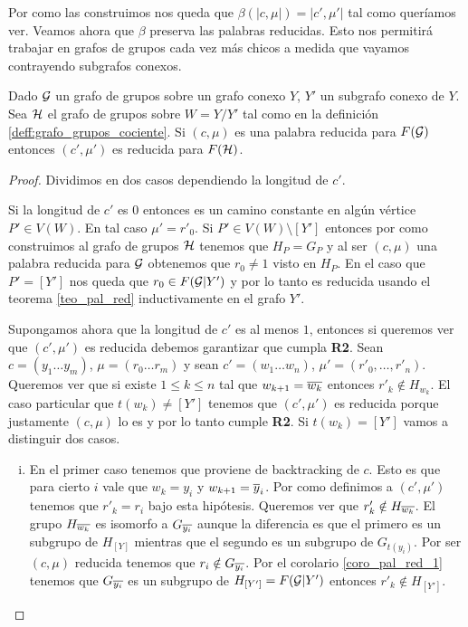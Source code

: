 \documentclass[tesis.tex]{subfiles}
\begin{document}
Por como las construimos nos queda que $\beta(|c,\mu|) = |c',\mu'|$ tal como queríamos ver.
Veamos ahora que $\beta$ preserva las palabras reducidas. 
Esto nos permitirá trabajar en grafos de grupos cada vez más chicos a medida que vayamos contrayendo subgrafos conexos.

\begin{prop}\label{lema_pal_red_iso}
	Dado ${\cal G}$ un grafo de grupos sobre un grafo conexo $Y$, $Y'$ un subgrafo conexo de $Y$.
	Sea ${\cal H}$ el grafo de grupos sobre $W = Y/Y'$ tal como en la definición \ref{deff:grafo_grupos_cociente}.
	Si $(c, \mu)$ es una palabra reducida para $F({\cal G})$ entonces $(c', \mu')$ es reducida para $F({\cal H})$.
\end{prop}
\begin{proof}
	Dividimos en dos casos dependiendo la longitud de $c'$.
	
	Si la longitud de $c'$ es  $0$ entonces es un camino constante en algún vértice $P' \in V(W)$. 
	En tal caso $\mu' = r'_0$.
	Si $P' \in V(W) \setminus [Y']$ entonces por como construimos al grafo de grupos $\cal H$ tenemos que $H_P = G_P$ y al ser $(c, \mu)$ una palabra reducida para ${\cal G}$ obtenemos que $r_0 \neq 1$ visto en $H_P$.
	En el caso que $P' = [Y']$ nos queda que $r_0 \in F({\cal G} | Y')$ y por lo tanto es reducida usando el teorema \ref{teo_pal_red} inductivamente en el grafo $Y'$.
	
	Supongamos ahora que la longitud de $c'$ es al menos $1$, entonces si queremos ver que  $(c',\mu')$ es reducida debemos garantizar que cumpla \textbf{R2}.
	Sean $c = (y_{1} \dots y_{m})$, $\mu = (r_{0} \dots r_{m})$ y sean
	$c' = (w_1 \dots w_{n})$, $\mu' = (r'_0, \dots, r'_n)$.
	Queremos ver que si existe $1 \le k \le n$ tal que  $w_{k+1} = \overline{w_k}$ entonces $r'_k \notin H_{w_k}$.		
	El caso particular que $t(w_k) \neq [Y']$ tenemos que $(c', \mu')$ es reducida porque justamente $(c, \mu)$ lo es y por lo tanto cumple \textbf{R2}.
	Si $t(w_k) = [Y']$ vamos a distinguir dos casos.
	
	\begin{enumerate}[i)]
		\item En el primer caso tenemos que proviene de backtracking de $c$.
		Esto es que para cierto $i$ vale que $w_{k} = y_i$ y  $w_{k+1} = \overline y_i$.
		Por como definimos a $(c', \mu')$ tenemos que $r'_k = r_i$ bajo esta hipótesis.
		Queremos ver que $r'_k \notin H_{\overline{w_k}}$.
		El grupo $H_{\overline{w_k}}$ es isomorfo a $G_{\overline{y_i}}$ aunque la diferencia es que el primero es un subgrupo de $H_{[Y]}$ mientras que el segundo es un subgrupo de $G_{t(y_i)}$.
		Por ser $(c, \mu)$ reducida tenemos que $r_i \notin G_{\overline{y_i}}$.
		Por el corolario \ref{coro_pal_red_1} tenemos que $G_{\overline{y_i}}$ es un subgrupo de $H_{[Y']} = F({\cal G} | Y')$ entonces $r'_k \notin H_{[Y']}$.
		

\end{enumerate}
\end{proof}
\end{document}
